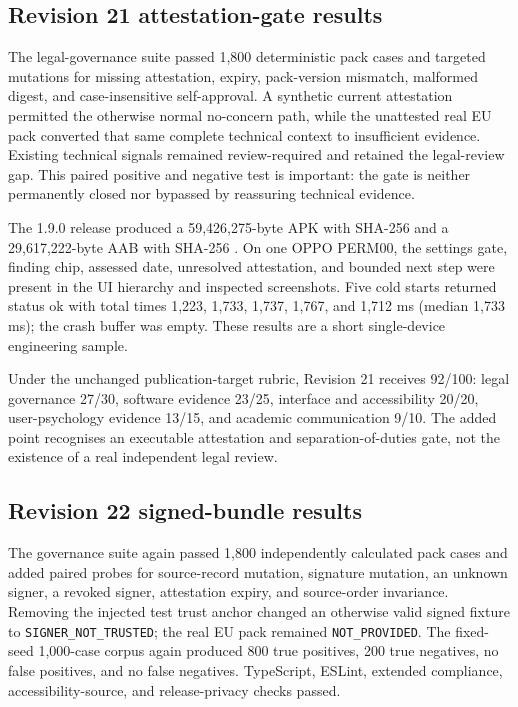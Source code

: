 \subsection{Revision 21 attestation-gate results}

The legal-governance suite passed 1,800 deterministic pack cases and targeted mutations for missing attestation, expiry, pack-version mismatch, malformed digest, and case-insensitive self-approval. A synthetic current attestation permitted the otherwise normal no-concern path, while the unattested real EU pack converted that same complete technical context to insufficient evidence. Existing technical signals remained review-required and retained the legal-review gap. This paired positive and negative test is important: the gate is neither permanently closed nor bypassed by reassuring technical evidence.

The 1.9.0 release produced a 59,426,275-byte APK with SHA-256 \texttt{} and a 29,617,222-byte AAB with SHA-256 \texttt{}. On one OPPO PERM00, the settings gate, finding chip, assessed date, unresolved attestation, and bounded next step were present in the UI hierarchy and inspected screenshots. Five cold starts returned status ok with total times 1,223, 1,733, 1,737, 1,767, and 1,712 ms (median 1,733 ms); the crash buffer was empty. These results are a short single-device engineering sample.

Under the unchanged publication-target rubric, Revision 21 receives 92/100: legal governance 27/30, software evidence 23/25, interface and accessibility 20/20, user-psychology evidence 13/15, and academic communication 9/10. The added point recognises an executable attestation and separation-of-duties gate, not the existence of a real independent legal review.

\subsection{Revision 22 signed-bundle results}

The governance suite again passed 1,800 independently calculated pack cases and added paired probes for source-record mutation, signature mutation, an unknown signer, a revoked signer, attestation expiry, and source-order invariance. Removing the injected test trust anchor changed an otherwise valid signed fixture to \texttt{SIGNER\_NOT\_TRUSTED}; the real EU pack remained \texttt{NOT\_PROVIDED}. The fixed-seed 1,000-case corpus again produced 800 true positives, 200 true negatives, no false positives, and no false negatives. TypeScript, ESLint, extended compliance, accessibility-source, and release-privacy checks passed.

